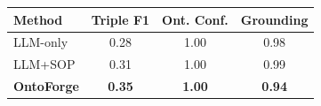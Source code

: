 \begin{tabular}{lccc}
\toprule
Method & Triple F1 & Ont. Conf. & Grounding \\
\midrule
LLM-only & 0.28 & 1.00 & 0.98 \\
LLM+SOP & 0.31 & 1.00 & 0.99 \\
\midrule
\textbf{OntoForge} & \textbf{0.35} & \textbf{1.00} & \textbf{0.94} \\
\bottomrule
\end{tabular}
